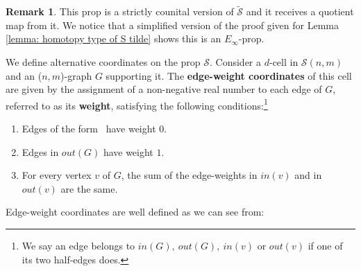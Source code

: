 \documentclass{amsart}
\renewcommand{\S}{\mathcal{S}}
\renewcommand{\1}{\mathbf{1}}
\theoremstyle{definition}
\newtheorem{remark}[theorem]{Remark}
\begin{document}
\begin{remark}
	This prop is a strictly counital version of $\tilde{\S}$ and it receives a quotient map from it. We notice that a simplified version of the proof given for Lemma \ref{lemma: homotopy type of S tilde} shows this is an $E_\infty$-prop.
\end{remark}

We define alternative coordinates on the prop $\S$.	Consider a $d$-cell in $\S(n,m)$ and an ($n,m$)-graph $G$ supporting it. The \textbf{edge-weight coordinates} of this cell are given by the assignment of a non-negative real number to each edge of $G$, referred to as its \textbf{weight}, satisfying the following conditions:\footnote{We say an edge belongs to $in(G),\ out(G),\ in(v)$ or $out(v)$ if one of its two half-edges does.} 
\begin{enumerate}
	\item Edges of the form \counit\ have weight $0$.
	\item Edges in $out(G)$ have weight $1$.
	\item For every vertex $v$ of $G$, the sum of the edge-weights in $in(v)$ and in $out(v)$ are the same.
\end{enumerate}
Edge-weight coordinates are well defined as we can see from:
\end{document}
